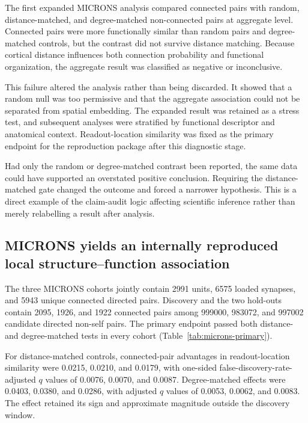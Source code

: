 The first expanded MICRONS analysis compared connected pairs with random,
distance-matched, and degree-matched non-connected pairs at aggregate level.
Connected pairs were more functionally similar than random pairs and
degree-matched controls, but the contrast did not survive distance matching.
Because cortical distance influences both connection probability and functional
organization, the aggregate result was classified as negative or inconclusive.

This failure altered the analysis rather than being discarded. It showed that a
random null was too permissive and that the aggregate association could not be
separated from spatial embedding. The expanded result was retained as a stress
test, and subsequent analyses were stratified by functional descriptor and
anatomical context. Readout-location similarity was fixed as the primary
endpoint for the reproduction package after this diagnostic stage.

Had only the random or degree-matched contrast been reported, the same data
could have supported an overstated positive conclusion. Requiring the
distance-matched gate changed the outcome and forced a narrower hypothesis. This
is a direct example of the claim-audit logic affecting scientific inference
rather than merely relabelling a result after analysis.

\subsection{MICRONS yields an internally reproduced local structure--function association}
\label{subsec:results-microns-internal-reproduction}

The three MICRONS cohorts jointly contain 2991 units, 6575 loaded synapses, and
5943 unique connected directed pairs. Discovery and the two hold-outs contain
2095, 1926, and 1922 connected pairs among 999000, 983072, and 997002 candidate
directed non-self pairs. The primary endpoint passed both distance- and
degree-matched tests in every cohort (Table~\ref{tab:microns-primary}).



For distance-matched controls, connected-pair advantages in readout-location
similarity were 0.0215, 0.0210, and 0.0179, with one-sided
false-discovery-rate-adjusted $q$ values of 0.0076, 0.0070, and 0.0087.
Degree-matched effects were 0.0403, 0.0380, and 0.0286, with adjusted $q$
values of 0.0053, 0.0062, and 0.0083. The effect retained its sign and
approximate magnitude outside the discovery window.

